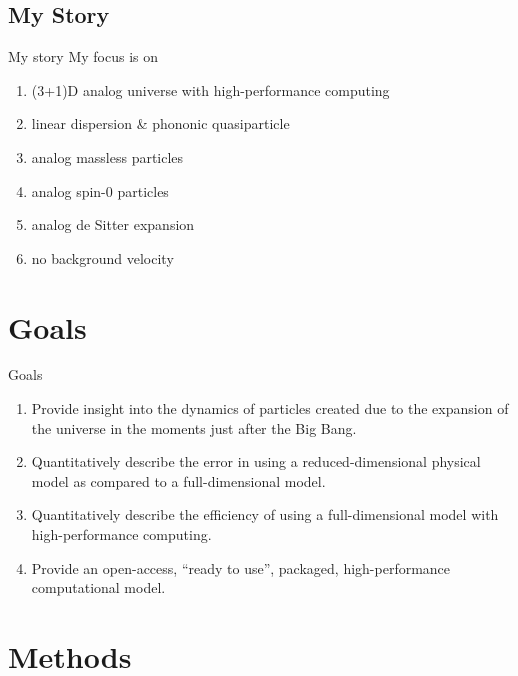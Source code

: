\documentclass[aspectratio=169]{beamer}
\begin{document}
    \subsection{My Story}
    
        \begin{frame}{My story}
            My focus is on
            \begin{enumerate}
                \item (3+1)D analog universe with high-performance computing
                \item linear dispersion \& phononic quasiparticle
                \item analog massless particles
                \item analog spin-0 particles
                \item analog de Sitter expansion
                \item no background velocity
            \end{enumerate}
        \end{frame}

\section{Goals}

    \begin{frame}{Goals}
        \begin{enumerate}
            \item Provide insight into the dynamics of particles created due to the expansion of the universe in the moments just after the Big Bang.
            \item Quantitatively describe the error in using a reduced-dimensional physical model as compared to a full-dimensional model.
            \item Quantitatively describe the efficiency of using a full-dimensional model with high-performance computing.
            \item Provide an open-access, ``ready to use'', packaged, high-performance computational model.
        \end{enumerate}
    \end{frame}

\section{Methods}
\end{document}
